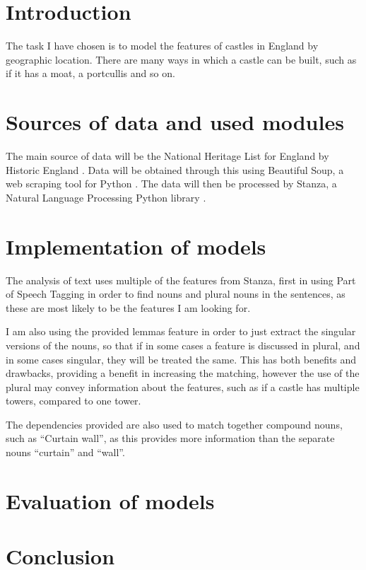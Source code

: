 \documentclass[11pt]{article}
\begin{document}
\maketitle

\section{Introduction}

The task I have chosen is to model the features of castles in England by geographic location. There are many ways in which a castle can be built, such as if it has a moat, a portcullis and so on.

\section{Sources of data and used modules}

The main source of data will be the National Heritage List for England by Historic England \cite{nhle}. Data will be obtained through this using Beautiful Soup, a web scraping tool for Python \cite{bs}. The data will then be processed by Stanza, a Natural Language Processing Python library \cite{qi2020stanza}.

\section{Implementation of models}

The analysis of text uses multiple of the features from Stanza, first in using Part of Speech Tagging in order to find nouns and plural nouns in the sentences, as these are most likely to be the features I am looking for.

I am also using the provided lemmas feature in order to just extract the singular versions of the nouns, so that if in some cases a feature is discussed in plural, and in some cases singular, they will be treated the same. This has both benefits and drawbacks, providing a benefit in increasing the matching, however the use of the plural may convey information about the features, such as if a castle has multiple towers, compared to one tower.

The dependencies provided are also used to match together compound nouns, such as “Curtain wall”, as this provides more information than the separate nouns “curtain” and “wall”.


\section{Evaluation of models}

\section{Conclusion}

\newpage
\printbibliography
\end{document}
